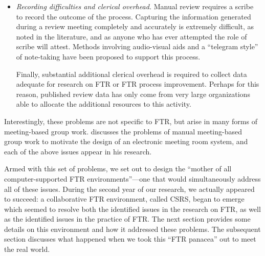 \begin{itemize}
\item {\em Recording difficulties and clerical overhead.} Manual review
  requires a scribe to record the outcome of the process.  Capturing the
  information generated during a review meeting completely and accurately is
  extremely difficult, as noted in the literature, and as anyone who has ever
  attempted the role of scribe will attest. Methods involving audio-visual
  aids and a ``telegram style'' of note-taking have been proposed to support
  this process.
  
  Finally, substantial additional clerical overhead is required to
  collect data adequate for research on FTR or FTR process improvement.
  Perhaps for this reason, published review data has only come from very
  large organizations able to allocate the additional resources to this
  activity.

\end{itemize}

Interestingly, these problems are not specific to FTR, but arise in many
forms of meeting-based group work.  \cite{Nunamaker91} discusses the
problems of manual meeting-based group work to motivate the design of an
electronic meeting room system, and each of the above issues appear in his
research.  

Armed with this set of problems, we set out to design the ``mother of all
computer-supported FTR environments''---one that would simultaneously
address all of these issues.  During the second year of our research, we
actually appeared to succeed: a collaborative FTR environment, called CSRS,
began to emerge which seemed to resolve both the identified issues in the
research on FTR, as well as the identified issues in the practice of FTR.
The next section provides some details on this environment and how it
addressed these problems.  The subsequent section discusses what happened
when we took this ``FTR panacea'' out to meet the real world.





